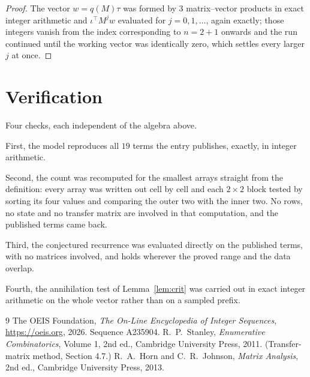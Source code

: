 \documentclass[11pt,a4paper]{article}
\theoremstyle{plain}
\theoremstyle{definition}
\begin{document}
\begin{proof}
The vector $w=q(M)\tau$ was formed by $3$ matrix--vector products in exact integer
arithmetic and $\iota^{\!\top}M^{j}w$ evaluated for $j=0,1,\dots$, again exactly; those
integers vanish from the index corresponding to $n=2+1$ onwards and the run continued
until the working vector was identically zero, which settles every larger $j$ at once.
\end{proof}

\section{Verification}

Four checks, each independent of the algebra above.

First, the model reproduces all $19$ terms the entry publishes, exactly, in integer
arithmetic.

Second, the count was recomputed for the smallest arrays straight from the definition: every
array was written out cell by cell and each $2\times2$ block tested by sorting its four values
and comparing the outer two with the inner two. No rows, no state and no transfer matrix are
involved in that computation, and the published terms came back.

Third, the conjectured recurrence was evaluated directly on the published terms, with no
matrices involved, and holds wherever the proved range and the data overlap.

Fourth, the annihilation test of Lemma~\ref{lem:crit} was carried out in exact integer
arithmetic on the whole vector rather than on a sampled prefix.

\begin{thebibliography}{9}
 The OEIS Foundation, \emph{The On-Line Encyclopedia of Integer
Sequences}, \url{https://oeis.org}, 2026. Sequence A235904.
 R.~P.~Stanley, \emph{Enumerative Combinatorics}, Volume 1, 2nd ed.,
Cambridge University Press, 2011. (Transfer-matrix method, Section 4.7.)
 R.~A.~Horn and C.~R.~Johnson, \emph{Matrix Analysis}, 2nd ed., Cambridge
University Press, 2013.
\end{thebibliography}
\end{document}
